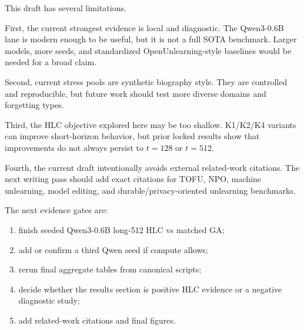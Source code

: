 This draft has several limitations.

First, the current strongest evidence is local and diagnostic.
The Qwen3-0.6B lane is modern enough to be useful, but it is not a full SOTA benchmark.
Larger models, more seeds, and standardized OpenUnlearning-style baselines would be needed for a broad claim.

Second, current stress pools are synthetic biography style.
They are controlled and reproducible, but future work should test more diverse domains and forgetting types.

Third, the HLC objective explored here may be too shallow.
K1/K2/K4 variants can improve short-horizon behavior, but prior locked results show that improvements do not always persist to $t=128$ or $t=512$.

Fourth, the current draft intentionally avoids external related-work citations.
The next writing pass should add exact citations for TOFU, NPO, machine unlearning, model editing, and durable/privacy-oriented unlearning benchmarks.

The next evidence gates are:

\begin{enumerate}[leftmargin=*]
  \item finish seeded Qwen3-0.6B long-512 HLC vs matched GA;
  \item add or confirm a third Qwen seed if compute allows;
  \item rerun final aggregate tables from canonical scripts;
  \item decide whether the results section is positive HLC evidence or a negative diagnostic study;
  \item add related-work citations and final figures.
\end{enumerate}
